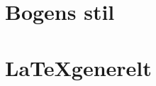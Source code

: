 

\newif\ifdraftmode
\draftmodetrue






	
	
	\tableofcontents
	
	
	\part{Bogens stil}
	
	\graphicspath{{sections/manual/custom-macros/figures/}}
	
	
	\part{\LaTeX generelt}
	
	\graphicspath{{sections/manual/intro-to-latex/figures/}}
	
	
	
